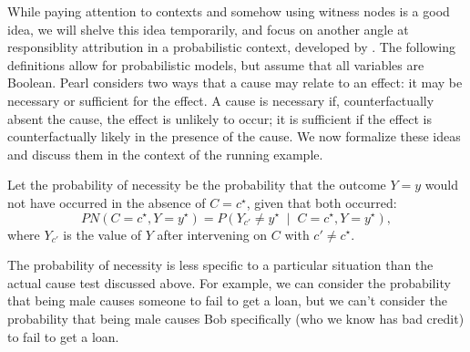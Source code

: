 \documentclass[anon,12pt]{clear2026} %
\makeatletter
\DeclareRobustCommand{\varname}[1]{\begingroup\newmcodes@\mathit{#1}\endgroup}
\newcommand{\pn}{\ensuremath{\mathit{PN}}}
\makeatother
\begin{document}
While paying attention to contexts and somehow using witness nodes is a good idea,
we will shelve this idea temporarily, and focus on another angle at responsiblity attribution in a probabilistic context, developed by \cite{pearl2022probabilities}.
The following definitions allow for probabilistic models, but assume that all variables are Boolean.
Pearl considers two ways that a cause may relate to an effect: it may be necessary or sufficient for the effect.
A cause is necessary if, counterfactually absent the cause, the effect is unlikely to occur; it is sufficient if the effect is counterfactually likely in the presence of the cause.
We now formalize these ideas and discuss them in the context of the running example.

\begin{definition}
Let the probability of necessity be the probability that the outcome $Y=y$ would not have occurred in the absence of  $C = c^\star$, given that both occurred: \[\pn(C = c^\star, Y = y^\star) = P\!\left(Y_{c'} \neq y^\star \;\middle|\; C = c^\star, Y = y^\star\right),\] where $Y_{c'}$ is the value of $Y$ after intervening on $C$ with $c'\neq c^\star$.
\end{definition}

The probability of necessity is less specific to a particular situation than the actual cause test discussed above.
For example, we can consider the probability that being male causes someone to fail to get a loan, but we can't consider the probability that being male causes Bob specifically (who we know has bad credit) to fail to get a loan.
\end{document}
